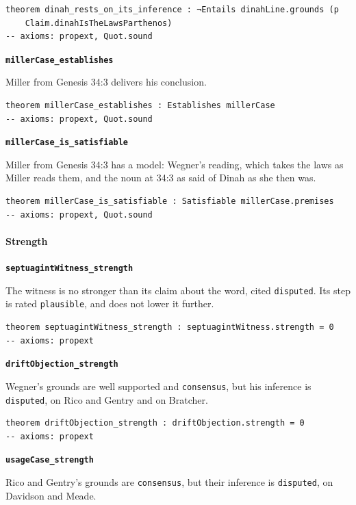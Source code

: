\documentclass[11pt]{article}
\begin{document}
{\small\begin{verbatim}
theorem dinah_rests_on_its_inference : ¬Entails dinahLine.grounds (p
    Claim.dinahIsTheLawsParthenos)
-- axioms: propext, Quot.sound
\end{verbatim}}
\par\medskip\noindent\textbf{\texttt{miller\allowbreak{}Case\_\allowbreak{}establishes}}\par\nobreak\noindent
Miller from Genesis 34:3 delivers his conclusion.

{\small\begin{verbatim}
theorem millerCase_establishes : Establishes millerCase
-- axioms: propext, Quot.sound
\end{verbatim}}
\par\medskip\noindent\textbf{\texttt{miller\allowbreak{}Case\_\allowbreak{}is\_\allowbreak{}satisfiable}}\par\nobreak\noindent
Miller from Genesis 34:3 has a model: Wegner’s reading, which takes the laws as Miller reads them, and the noun at 34:3 as said of Dinah as she then was.

{\small\begin{verbatim}
theorem millerCase_is_satisfiable : Satisfiable millerCase.premises
-- axioms: propext, Quot.sound
\end{verbatim}}
\paragraph*{Strength}
\leavevmode\par\nobreak
\par\medskip\noindent\textbf{\texttt{septuagint\allowbreak{}Witness\_\allowbreak{}strength}}\par\nobreak\noindent
The witness is no stronger than its claim about the word, cited \texttt{disputed}. Its step is rated \texttt{plausible}, and does not lower it further.

{\small\begin{verbatim}
theorem septuagintWitness_strength : septuagintWitness.strength = 0
-- axioms: propext
\end{verbatim}}
\par\medskip\noindent\textbf{\texttt{drift\allowbreak{}Objection\_\allowbreak{}strength}}\par\nobreak\noindent
Wegner’s grounds are well supported and \texttt{consensus}, but his inference is \texttt{disputed}, on Rico and Gentry and on Bratcher.

{\small\begin{verbatim}
theorem driftObjection_strength : driftObjection.strength = 0
-- axioms: propext
\end{verbatim}}
\par\medskip\noindent\textbf{\texttt{usage\allowbreak{}Case\_\allowbreak{}strength}}\par\nobreak\noindent
Rico and Gentry’s grounds are \texttt{consensus}, but their inference is \texttt{disputed}, on Davidson and Meade.
\end{document}

